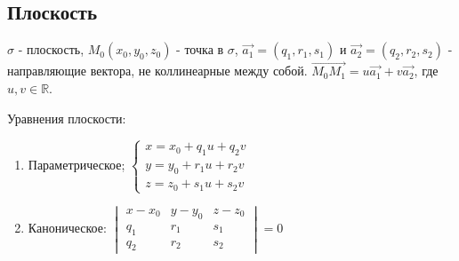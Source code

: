 \documentclass[a4paper]{article}
\begin{document}
    \newpage \begin{center}
                 \begin{Large}
                 \end{Large}
    \end{center}
    \subsection*{Плоскость}

    $\sigma$ - плоскость, $M_0(x_0, y_0, z_0)$ - точка в $\sigma$, $\vec{a_1} = (q_1, r_1, s_1)$ и $\vec{a_2} = (q_2, r_2, s_2)$ - направляющие вектора, не коллинеарные между собой.
    $\overrightarrow{M_0M_1} = u\vec{a_1} + v\vec{a_2}$, где $u, v \in \mathbb{R}$.


    Уравнения плоскости: \begin{enumerate}
                             \item Параметрическое; $
                             \begin{cases}
                                 x = x_0 + q_1u + q_2v
                                 \\
                                 y = y_0 + r_1u + r_2v
                                 \\
                                 z = z_0 + s_1u + s_2v
                             \end{cases}
                             $
                             \item Каноническое: $\begin{vmatrix}
                                                      x-x_0 & y-y_0 & z-z_0 \\
                                                      q_1   & r_1   & s_1   \\
                                                      q_2   & r_2   & s_2
                             \end{vmatrix} = 0$


\end{enumerate}
\end{document}
